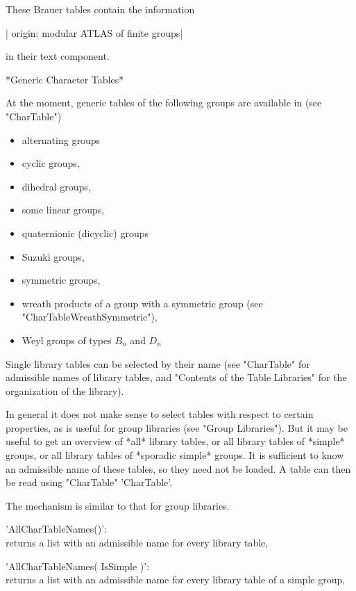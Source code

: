 These Brauer tables contain the information

|    origin: modular ATLAS of finite groups|

in their text component.

*Generic Character Tables*

At the moment, generic  tables of the  following groups are  available in
{\GAP} (see "CharTable")\:

\begin{itemize}
\item alternating groups
\item cyclic groups,
\item dihedral groups,
\item some linear groups,
\item quaternionic (dicyclic) groups
\item Suzuki groups,
\item symmetric groups,
\item wreath   products   of  a   group   with  a  symmetric  group  (see
      "CharTableWreathSymmetric"),
\item Weyl groups of types $B_n$ and $D_n$
\end{itemize}



Single library tables can be selected by their  name (see "CharTable" for
admissible names of library tables, and "Contents of the Table Libraries"
for the organization of the library).

In general  it  does not  make sense  to  select tables   with respect to
certain   properties,  as is  useful   for  group  libraries (see  "Group
Libraries").  But it may  be useful to  get an overview of *all*  library
tables, or all  library tables of *simple* groups,  or all library tables
of *sporadic simple* groups.  It is sufficient to know an admissible name
of these tables, so they  need not be  loaded.  A table  can then be read
using "CharTable" 'CharTable'.

The mechanism is similar to that for group libraries.

'AllCharTableNames()': \\
         returns a list  with an admissible name for every library table,

'AllCharTableNames( IsSimple )': \\
         returns a list  with an admissible name  for every library table
         of a simple group,

